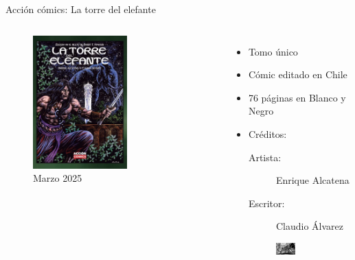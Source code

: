 \begin{frame}{Acción cómics: La torre del elefante}
	\begin{columns}
		\begin{figure}[htb]
			\centering
			\includegraphics[width=0.6\textwidth]{img/AlcatenaTorre}
			\caption{Marzo 2025}
		\end{figure}
		\begin{itemize}
			\item Tomo único
			\item Cómic editado en Chile
			\item 76 páginas en Blanco y Negro
			\item Créditos:
			\begin{description}
				\item[Artista:] Enrique Alcatena
				\item[Escritor:] Claudio Álvarez
			\end{description}
			\begin{figure}[htb]
				\centering
				\includegraphics[width=0.4\textwidth]{img/AlcatenaTorre2}
			\end{figure}
		\end{itemize}
	\end{columns}
\end{frame}

